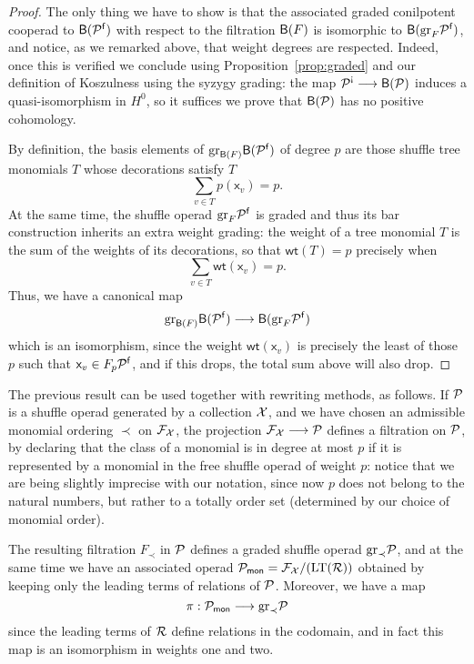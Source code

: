  \begin{proof}
 The only thing we have to show is that the
 associated graded conilpotent cooperad to
 $\mathsf{B}(\mathcal P^{\mathsf{f}})$ with respect to the filtration
 $\mathsf{B}(F)$ is isomorphic to $\mathsf{B}(\mathrm{gr}_F\mathcal P^{\mathsf{f}})$,
 and notice, as we remarked above, that
 weight degrees are respected.
 Indeed, once this is verified we conclude using
 Proposition~\ref{prop:graded} and our definition
 of Koszulness using the syzygy grading: the
 map $\PP^\antishriek \longrightarrow \B{\PP}$
 induces a quasi-isomorphism in $H^0$, so it suffices
 we prove that $\mathsf{B}(\mathcal P)$ has no positive cohomology.
 
 By definition, the basis elements of
 $\mathrm{gr}_{\mathsf{B}(F)}\mathsf{B}(\mathcal P^{\mathsf{f}})$ of degree $p$
 are those shuffle tree monomials $T$
 whose decorations satisfy $T$
 \[
 \sum_{v\in T} p(\mathsf{x}_v) = p.
 \]
 At the same time, the shuffle operad 
 $\mathrm{gr}_F\mathcal P^{\mathsf{f}}$  is graded and 
 thus its bar construction inherits an
 extra weight grading: the weight of a tree
 monomial $T$ is the sum of the weights of its
 decorations, so that $\mathsf{wt}(T)= p$
 precisely when
 \[
 \sum_{v\in T} \mathsf{wt}(\mathsf{x}_v) = p.
 \]
 Thus, we have a canonical map
 \[
 \mathrm{gr}_{\mathsf{B}(F)}\mathsf{B}(\mathcal P^{\mathsf{f}}) \longrightarrow
 \mathsf{B}(\mathrm{gr}_F\mathcal P^{\mathsf{f}})
 \]
 which is an isomorphism, since the weight
 $\mathsf{wt}(\mathsf{x}_v)$ is precisely
 the least of those $p$ such that $\mathsf{x}_v
 \in F_p\mathcal P^{\mathsf{f}}$, and if this drops, the total sum above
 will also drop.  \end{proof}
 
 The previous result can be used together with
 rewriting methods, as follows. If $\mathcal P$ is
 a shuffle operad generated by a collection
 $\mathcal{X}$, and we have chosen an admissible 
 monomial ordering $\prec $
 on $\mathcal{F}_{\mathcal{X}}$, the projection
 $\mathcal{F}_{\mathcal{X}}\longrightarrow \mathcal P$ defines a filtration
 on $\mathcal P$, by declaring that the class of a 
 monomial is in degree at most $p$ if it
 is represented by a monomial in the free shuffle
 operad of weight $p$: notice that we are being
 slightly imprecise with our notation, since now
 $p$ does not belong to the natural numbers,
 but rather to a totally order set (determined by
 our choice of monomial order).
 
 The resulting filtration $F_\prec$ in $\mathcal P$
 defines a graded shuffle operad $\mathrm{gr}_\prec
 \mathcal P$, and at the same time we have an associated
 operad $\mathcal P_{\mathsf{mon}} = \mathcal{F}_{\mathcal{X}} / (\operatorname{LT}(\mathcal{R}))$
 obtained by keeping only the leading terms
 of relations of $\mathcal P$. Moreover, we have a map
 \[
 \pi : \mathcal P_{\mathsf{mon}} 
  	\longrightarrow 
  	\mathrm{gr}_\prec \mathcal P
 \]
 since the leading terms of $\mathcal{R}$ define
 relations in the codomain, and in fact this
 map is an isomorphism in weights one and two.
 
